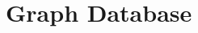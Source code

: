 \documentclass{beamer}
\newcommand{\linespace}{\vskip 0.25cm}
\begin{document}

	
	
	
	
	
	

\section[Graph DB]{Graph Database}
\end{document}
